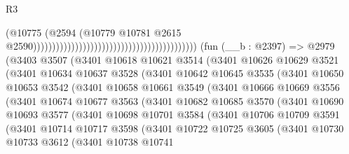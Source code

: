\begin{lexlean}{R3}
\begin{coremodule}
                                                                                    (@10775
                                                                                      (@2594
                                                                                        (@10779
                                                                                          @10781
                                                                                          @2615
                                                                                          @2590)))))))))))))))))))))))))))))))))))))))))))
    (fun (__b : @2397) =>
    @2979
      (@3403
        @3507
        (@3401
          @10618
          @10621
          @3514
          (@3401
            @10626
            @10629
            @3521
            (@3401
              @10634
              @10637
              @3528
              (@3401
                @10642
                @10645
                @3535
                (@3401
                  @10650
                  @10653
                  @3542
                  (@3401
                    @10658
                    @10661
                    @3549
                    (@3401
                      @10666
                      @10669
                      @3556
                      (@3401
                        @10674
                        @10677
                        @3563
                        (@3401
                          @10682
                          @10685
                          @3570
                          (@3401
                            @10690
                            @10693
                            @3577
                            (@3401
                              @10698
                              @10701
                              @3584
                              (@3401
                                @10706
                                @10709
                                @3591
                                (@3401
                                  @10714
                                  @10717
                                  @3598
                                  (@3401
                                    @10722
                                    @10725
                                    @3605
                                    (@3401
                                      @10730
                                      @10733
                                      @3612
                                      (@3401
                                        @10738
                                        @10741

\end{coremodule}
\end{lexlean}
